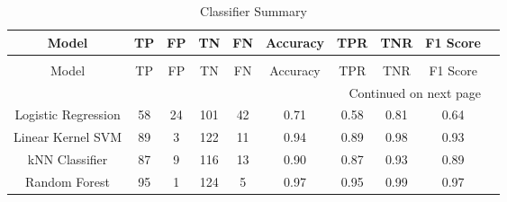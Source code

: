 \begin{longtable}[h!]{c|c|c|c|c|c|c|c|c|c}
\caption{Classifier Summary} \label{tab:summary_datatable} \\
\toprule
Model & TP & FP & TN & FN & Accuracy & TPR & TNR & F1 Score \\
\midrule
\endfirsthead
\caption[]{Classifier Summary} \\
\toprule
Model & TP & FP & TN & FN & Accuracy & TPR & TNR & F1 Score \\
\midrule
\endhead
\midrule
\multicolumn{9}{r}{Continued on next page} \\
\midrule
\endfoot
\bottomrule
\endlastfoot
Logistic Regression & 58 & 24 & 101 & 42 & 0.71 & 0.58 & 0.81 & 0.64 \\
Linear Kernel SVM & 89 & 3 & 122 & 11 & 0.94 & 0.89 & 0.98 & 0.93 \\
kNN Classifier & 87 & 9 & 116 & 13 & 0.90 & 0.87 & 0.93 & 0.89 \\
Random Forest & 95 & 1 & 124 & 5 & 0.97 & 0.95 & 0.99 & 0.97 \\
\end{longtable}
